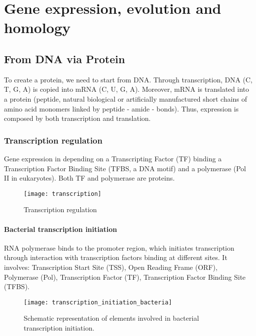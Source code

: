 \chapter{Gene expression, evolution and homology}

\section{From DNA via Protein}

To create a protein, we need to start from DNA. Through transcription, DNA (C,
T, G, A) is copied into mRNA (C, U, G, A). Moreover, mRNA is translated into a 
protein (peptide, natural biological or artificially manufactured short chains 
of amino acid monomers linked by peptide - amide - bonds). Thus, expression is 
composed by both transcription and translation.

\subsection{Transcription regulation}

Gene expression in depending on a Transcripting Factor (TF) binding a Transcription 
Factor Binding Site (TFBS, a DNA motif) and a polymerase (Pol II in eukaryotes). 
Both TF and polymerase are proteins.

\begin{figure}
\centering
\texttt{[image: transcription]}
\caption{Transcription regulation}
\label{Transcritpion regulation}
\end{figure}

\subsubsection{Bacterial transcription initiation}

RNA polymerase binds to the promoter region, which initiates transcription 
through interaction with transcription factors binding at different sites. 
It involves: Transcription Start Site (TSS), Open Reading Frame (ORF), 
Polymerase (Pol), Transcription Factor (TF), Transcription Factor Binding Site 
(TFBS).

\begin{figure}
\centering
\texttt{[image: transcription\_initiation\_bacteria]}
\caption{Schematic representation of elements involved in bacterial transcription initiation.}
\label{Transcritpion initiation in bacteria}
\end{figure}

